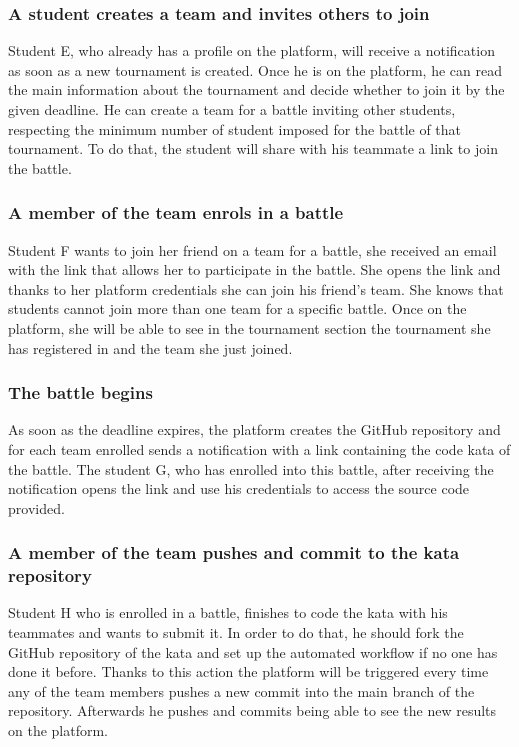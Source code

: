 \subsubsection{ A student creates a team and invites others to join}
Student E, who already has a profile on the platform, will receive a notification as soon as a new tournament is created. Once he is on the platform, he can read the main information about the tournament and decide whether to join it by the given deadline.
He can create a team for a battle inviting other students, respecting the minimum number of student imposed for the battle of that tournament. To do that, the student will share with his teammate a link to join the battle.

\subsubsection{ A member of the team enrols in a battle}
Student F wants to join her friend on a team for a battle, she received an email with the link that allows her to participate in the battle. She opens the link and thanks to her platform credentials she can join his friend's team.
She knows that students cannot join more than one team for a specific battle.
Once on the platform, she will be able to see in the tournament section the tournament she has registered in and the team she just joined.

\subsubsection{The battle begins}
As soon as the deadline expires, the platform creates the GitHub repository and for each team enrolled sends a notification with a link containing the code kata of the battle. The student G, who has enrolled into this battle, after receiving the notification opens the link and use his credentials to access the source code provided.

\subsubsection{A member of the team pushes and commit to the kata repository}
Student H who is enrolled in a battle, finishes to code the kata with his teammates and wants to submit it. In order to do that, he should fork the GitHub repository of the kata and set up the automated workflow if no one has done it before.
Thanks to this action the platform will be triggered every time any of the team members pushes a new commit into the main branch of the repository. Afterwards he pushes and commits being able to see the new results on the platform.

